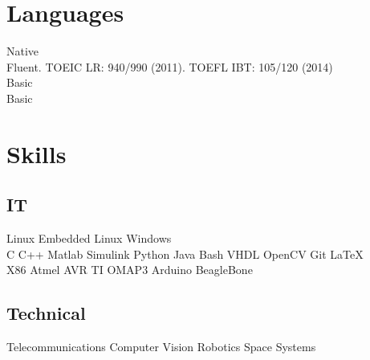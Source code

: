 \documentclass[a4paper]{deedy-resume} %
\begin{document}
\begin{minipage}[t]{0.25\textwidth} %



\section{Languages}

Native\\
\vspace{4pt}
Fluent. TOEIC LR: 940/990 (2011). TOEFL IBT: 105/120 (2014)\\
\vspace{4pt}
Basic\\
\vspace{4pt}
Basic

\sectionspace %


\section{Skills}

\subsection{IT}
\vspace{2pt}
Linux \textbullet{} Embedded Linux \textbullet{} Windows\\
\vspace{3pt}
C \textbullet{} C++ \textbullet{} Matlab \textbullet{} Simulink \textbullet{} Python \textbullet{} Java \textbullet{} Bash \textbullet{} VHDL \textbullet{} OpenCV \textbullet{} Git \textbullet{} \LaTeX\\
\vspace{3pt}
X86 \textbullet{} Atmel AVR \textbullet{} TI OMAP3 \textbullet{} Arduino \textbullet{} BeagleBone

\sectionspace %


\subsection{Technical}
Telecommunications \textbullet{} Computer Vision \textbullet{} Robotics \textbullet{} Space Systems


\end{minipage}
\end{document}
